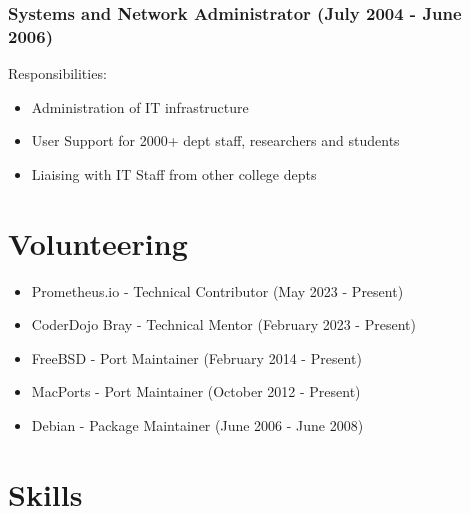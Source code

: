 \documentclass[a4paper, 10pt] {article}
\begin{document}
\subsubsection*{Systems and Network Administrator (July 2004 - June 2006)}

Responsibilities:

\begin{itemize}[itemsep=2pt,parsep=2pt]
  \item Administration of IT infrastructure
  \item User Support for 2000+ dept staff, researchers and students
  \item Liaising with IT Staff from other college depts
\end{itemize}

\hrulefill

\section*{Volunteering}

\begin{itemize}[itemsep=2pt,parsep=2pt]
  \item Prometheus.io - Technical Contributor (May 2023 - Present)
  \item CoderDojo Bray - Technical Mentor (February 2023 - Present)
  \item FreeBSD  - Port Maintainer (February 2014 - Present)
  \item MacPorts  - Port Maintainer (October 2012 - Present)
  \item Debian - Package Maintainer (June 2006 - June 2008)
\end{itemize}

\hrulefill

\section*{Skills}
\end{document}
